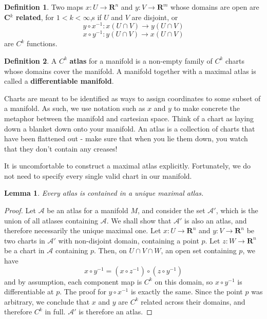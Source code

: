\documentclass[12pt]{report}
\theoremstyle{plain}
\newtheorem{lemma}[theorem]{Lemma}
\theoremstyle{definition}
\newtheorem*{defi}{Definition}
\newenvironment{definition}
    {\begin{samepage}\begin{framed}\begin{defi}}
    {\end{defi}\end{framed}\end{samepage}}
\begin{document}
\begin{definition}
    Two maps $x:U \to \mathbf{R}^n$ and $y:V \to \mathbf{R}^m$ whose domains are open are {\bf C$^k$ related}, for $1 < k < \infty$,s if $U$ and $V$ are disjoint, or
    \[ y \circ x^{-1} : x(U \cap V) \to y(U \cap V) \]
    \[ x \circ y^{-1} : y(U \cap V) \to x(U \cap V) \]
    are $C^k$ functions.
\end{definition}

\begin{definition}
    A $C^k$ {\bf atlas} for a manifold is a non-empty family of $C^k$ charts whose domains cover the manifold. A manifold together with a maximal atlas is called a {\bf differentiable manifold}.
\end{definition}

Charts are meant to be identified as ways to assign coordinates to some subset of a manifold. As such, we use notation such as $x$ and $y$ to make concrete the metaphor between the manifold and cartesian space. Think of a chart as laying down a blanket down onto your manifold. An atlas is a collection of charts that have been flattened out - make sure that when you lie them down, you watch that they don't contain any creases!

It is uncomfortable to construct a maximal atlas explicitly. Fortunately, we do not need to specify every single valid chart in our manifold.

\begin{lemma}
    Every atlas is contained in a unique maximal atlas.
\end{lemma}
\begin{proof}
Let $\mathcal{A}$ be an atlas for a manifold $M$, and consider the set $\mathcal{A}'$, which is the union of all atlases containing $\mathcal{A}$. We shall show that $\mathcal{A}'$ is also an atlas, and therefore necessarily the unique maximal one. Let $x:U \to \mathbf{R}^n$ and $y:V \to \mathbf{R}^n$ be two charts in $\mathcal{A}'$ with non-disjoint domain, containing a point $p$. Let $z:W \to \mathbf{R}^n$ be a chart in $\mathcal{A}$ containing $p$. Then, on $U \cap V \cap W$, an open set containing $p$, we have
%
\[ x \circ y^{-1} = (x \circ z^{-1}) \circ (z \circ y^{-1}) \]
%
and by assumption, each component map is $C^k$ on this domain, so $x \circ y^{-1}$ is differentiable at $p$. The proof for $y \circ x^{-1}$ is exactly the same. Since the point $p$ was arbitrary, we conclude that $x$ and $y$ are $C^k$ related across their domains, and therefore $C^k$ in full. $\mathcal{A}'$ is therefore an atlas.
\end{proof}
\end{document}
